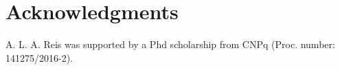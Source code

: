 \section{Acknowledgments}
\label{sec:acknowledgments}

A. L. A. Reis was supported by a Phd scholarship from CNPq (Proc. number: 141275/2016-2). 
